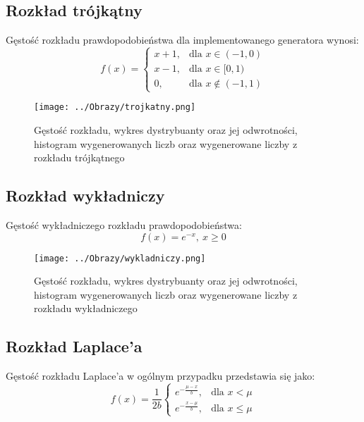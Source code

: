 \documentclass[12pt,a4paper]{article}
\begin{document}
\subsection{Rozkład trójkątny}
Gęstość rozkładu prawdopodobieństwa dla implementowanego generatora wynosi:
\begin{equation}\label{eq:trojkatny}
f(x) = \begin{cases} x + 1, & \mbox{dla } x \in (-1,0) \\ x - 1, & \mbox{dla } x \in [0,1) \\ 0, & \mbox{dla } x \not\in (-1,1) \end{cases}
\end{equation}

\begin{figure}[H]
\centering
\texttt{[image: ../Obrazy/trojkatny.png]} 
\caption{Gęstość rozkładu, wykres dystrybuanty oraz jej odwrotności, histogram wygenerowanych liczb oraz wygenerowane liczby z rozkładu trójkątnego}
\label{fig:trojkatnyL2}
\end{figure}

\subsection{Rozkład wykładniczy}
Gęstość wykładniczego rozkładu prawdopodobieństwa:
\begin{equation}
f(x) = e^{-x},\ x \geq 0
\end{equation}

\begin{figure}[H]
\centering
\texttt{[image: ../Obrazy/wykladniczy.png]} 
\caption{Gęstość rozkładu, wykres dystrybuanty oraz jej odwrotności, histogram wygenerowanych liczb oraz wygenerowane liczby z rozkładu wykładniczego}
\label{fig:wykladniczyL2}
\end{figure}

\subsection{Rozkład Laplace'a}
Gęstość rozkładu Laplace'a w ogólnym przypadku przedstawia się jako:
\begin{equation}\label{eq:laplace}
f(x) = \frac{1}{2b}\begin{cases} e^{-\frac{\mu-x}{b}}, & \mbox{dla } x < \mu \\ e^{-\frac{x-\mu}{b}}, & \mbox{dla } x \leq \mu\end{cases}
\end{equation}
\end{document}
